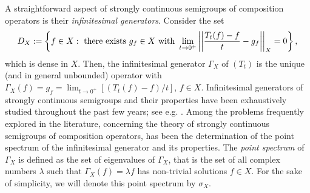\documentclass[11pt]{amsart}
\numberwithin{equation}{section}
\theoremstyle{definition}
\begin{document}
	A straightforward aspect of strongly continuous semigroups of composition operators is their \textit{infinitesimal generators}. Consider the set 
	\begin{equation*}
		D_X:=\left\{f\in X: \textup{ there exists }g_f\in X \textup{ with } \lim\limits_{t\to0^+}\left|\left|\dfrac{T_t(f)-f}{t}-g_f\right|\right|_X=0\right\},
	\end{equation*}
	which is dense in $X$. Then, the infinitesimal generator $\Gamma_X$ of $(T_t)$ is the unique (and in general unbounded) operator with $\Gamma_X(f)=g_f=\lim_{t\to0^+}[(T_t(f)-f)/t]$, $f\in X$. Infinitesimal generators of strongly continuous semigroups and their properties have been exhaustively studied throughout the past few years; see e.g. \cite{Chalendar, Gallardo_siskakis, Gallardo_Yakubovich, Reich_Shoikhet}. Among the problems frequently explored in the literature, concerning the theory of strongly continuous semigroups of composition operators, has been the determination of the point spectrum of the infinitesimal generator and its properties. The \textit{point spectrum} of $\Gamma_X$ is defined as the set of eigenvalues of $\Gamma_X$, that is the set of all complex numbers $\lambda$ such that $\Gamma_X(f)=\lambda f$ has non-trivial solutions $f\in X$. For the sake of simplicity, we will denote this point spectrum by $\sigma_X$.
	
\end{document}
